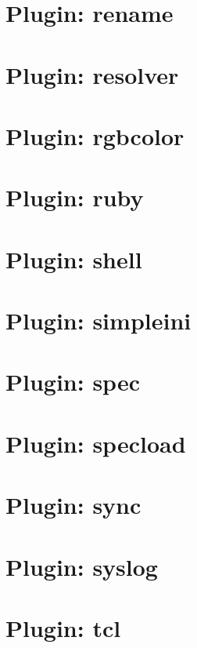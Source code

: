 \let\mypdfximage\pdfximage\def\pdfximage{\immediate\mypdfximage}\documentclass[twoside]{book}
\newcommand{\+}{\discretionary{\mbox{\scriptsize$\hookleftarrow$}}{}{}}
\begin{document}
\chapter{Plugin\+: rename}
\label{autotoc_md602}

\chapter{Plugin\+: resolver}
\label{autotoc_md618}

\chapter{Plugin\+: rgbcolor}
\label{autotoc_md628}

\chapter{Plugin\+: ruby}
\label{autotoc_md631}

\chapter{Plugin\+: shell}
\label{autotoc_md636}

\chapter{Plugin\+: simpleini}
\label{autotoc_md638}

\chapter{Plugin\+: spec}
\label{autotoc_md644}

\chapter{Plugin\+: specload}
\label{autotoc_md657}

\chapter{Plugin\+: sync}
\label{autotoc_md663}

\chapter{Plugin\+: syslog}
\label{autotoc_md665}

\chapter{Plugin\+: tcl}
\label{autotoc_md666}

\end{document}
